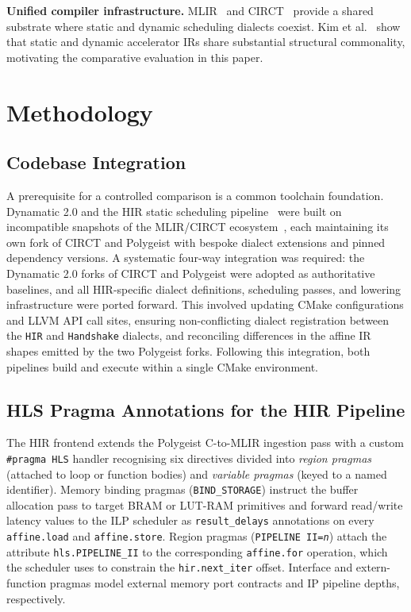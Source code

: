 \documentclass[sigplan,10pt,review,nonacm]{acmart}
\begin{document}
\textbf{Unified compiler infrastructure.}
MLIR~\cite{lattner2021mlir} and CIRCT~\cite{circt} provide a shared
substrate where static and dynamic scheduling dialects coexist.
Kim et al.~\cite{10.1145/3689790} show that static and dynamic
accelerator IRs share substantial structural commonality, motivating the
comparative evaluation in this paper.

\section{Methodology}
\label{sec:methodology}

\subsection{Codebase Integration}

A prerequisite for a controlled comparison is a common toolchain
foundation. Dynamatic 2.0 and the HIR static scheduling
pipeline~\cite{10.1145/3623278.3624767} were built on incompatible
snapshots of the MLIR/CIRCT ecosystem~\cite{circt,lattner2021mlir},
each maintaining its own fork of CIRCT and Polygeist with bespoke
dialect extensions and pinned dependency versions. A systematic
four-way integration was required: the Dynamatic 2.0 forks of CIRCT and
Polygeist were adopted as authoritative baselines, and all HIR-specific
dialect definitions, scheduling passes, and lowering infrastructure were
ported forward. This involved updating CMake configurations and LLVM API
call sites, ensuring non-conflicting dialect registration between the
\texttt{HIR} and \texttt{Handshake} dialects, and reconciling
differences in the affine IR shapes emitted by the two Polygeist forks.
Following this integration, both pipelines build and execute within a
single CMake environment.

\subsection{HLS Pragma Annotations for the HIR Pipeline}
\label{sec:pragma-handler}

The HIR frontend extends the Polygeist C-to-MLIR ingestion pass with a
custom \texttt{\#pragma HLS} handler recognising six directives divided
into \emph{region pragmas} (attached to loop or function bodies) and
\emph{variable pragmas} (keyed to a named identifier). Memory binding
pragmas (\texttt{BIND\_STORAGE}) instruct the buffer allocation pass to
target BRAM or LUT-RAM primitives and forward read/write latency values
to the ILP scheduler as \texttt{result\_delays} annotations on every
\texttt{affine.load} and \texttt{affine.store}. Region pragmas
(\texttt{PIPELINE II=\textit{n}}) attach the attribute
\texttt{hls.PIPELINE\_II} to the corresponding \texttt{affine.for}
operation, which the scheduler uses to constrain the
\texttt{hir.next\_iter} offset. Interface and extern-function pragmas
model external memory port contracts and IP pipeline depths,
respectively.
\end{document}
